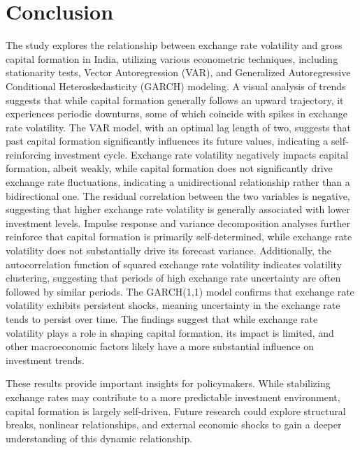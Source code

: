 \documentclass{article} %
\begin{document}
\section{Conclusion}

The study explores the relationship between exchange rate volatility and gross capital formation in India, utilizing various econometric techniques, including stationarity tests, Vector Autoregression (VAR), and Generalized Autoregressive Conditional Heteroskedasticity (GARCH) modeling.
A visual analysis of trends suggests that while capital formation generally follows an upward trajectory, it experiences periodic downturns, some of which coincide with spikes in exchange rate volatility. The VAR model, with an optimal lag length of two, suggests that past capital formation significantly influences its future values, indicating a self-reinforcing investment cycle. Exchange rate volatility negatively impacts capital formation, albeit weakly, while capital formation does not significantly drive exchange rate fluctuations, indicating a unidirectional relationship rather than a bidirectional one. The residual correlation between the two variables is negative, suggesting that higher exchange rate volatility is generally associated with lower investment levels.
Impulse response and variance decomposition analyses further reinforce that capital formation is primarily self-determined, while exchange rate volatility does not substantially drive its forecast variance. Additionally, the autocorrelation function of squared exchange rate volatility indicates volatility clustering, suggesting that periods of high exchange rate uncertainty are often followed by similar periods.
The GARCH(1,1) model confirms that exchange rate volatility exhibits persistent shocks, meaning uncertainty in the exchange rate tends to persist over time. The findings suggest that while exchange rate volatility plays a role in shaping capital formation, its impact is limited, and other macroeconomic factors likely have a more substantial influence on investment trends.

These results provide important insights for policymakers. While stabilizing exchange rates may contribute to a more predictable investment environment, capital formation is largely self-driven. Future research could explore structural breaks, nonlinear relationships, and external economic shocks to gain a deeper understanding of this dynamic relationship.

\newpage
\end{document}
